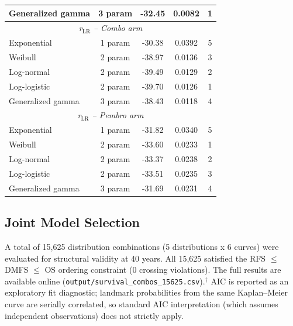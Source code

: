 \documentclass[11pt,a4paper]{article}
\begin{document}
\begin{table}[H]
\begin{tabular*}{\textwidth}{@{\extracolsep{\fill}}lcccc}
Generalized gamma & 3 param & -32.45 & 0.0082 & 1 \\
\midrule
\multicolumn{5}{c}{\textit{r$_{\text{LR}}$ -- Combo arm}} \\
Exponential & 1 param & -30.38 & 0.0392 & 5 \\
Weibull & 2 param & -38.97 & 0.0136 & 3 \\
Log-normal & 2 param & -39.49 & 0.0129 & 2 \\
Log-logistic & 2 param & -39.70 & 0.0126 & 1 \\
Generalized gamma & 3 param & -38.43 & 0.0118 & 4 \\
\midrule
\multicolumn{5}{c}{\textit{r$_{\text{LR}}$ -- Pembro arm}} \\
Exponential & 1 param & -31.82 & 0.0340 & 5 \\
Weibull & 2 param & -33.60 & 0.0233 & 1 \\
Log-normal & 2 param & -33.37 & 0.0238 & 2 \\
Log-logistic & 2 param & -33.51 & 0.0235 & 3 \\
Generalized gamma & 3 param & -31.69 & 0.0231 & 4 \\
\bottomrule
\end{tabular*}
\end{table}

\subsection{Joint Model Selection}
\label{sec:joint}
A total of 15,625 distribution combinations (5 distributions x 6 curves) were evaluated for structural validity at 40 years. All 15,625 satisfied the RFS $\leq$ DMFS $\leq$ OS ordering constraint (0 crossing violations). The full results are available online (\texttt{output/survival\_combos\_15625.csv}).$^{\dagger}$ AIC is reported as an exploratory fit diagnostic; landmark probabilities from the same Kaplan--Meier curve are serially correlated, so standard AIC interpretation (which assumes independent observations) does not strictly apply.
\end{document}

